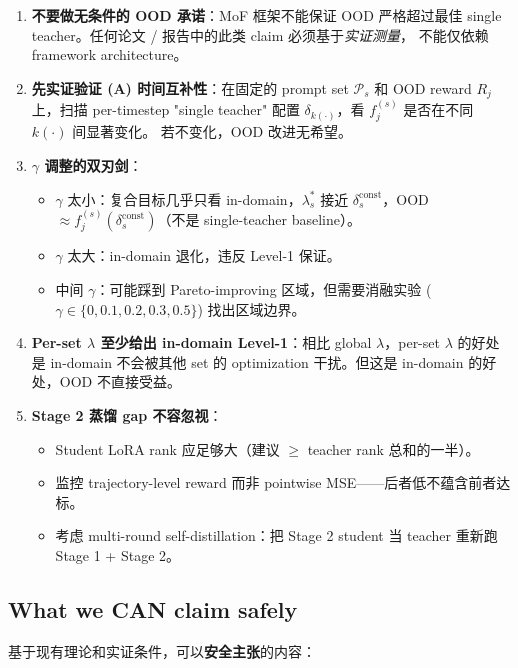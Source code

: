 \documentclass[11pt,a4paper]{article}
\newcommand{\const}{\mathrm{const}}
\theoremstyle{definition}
\begin{document}
\begin{enumerate}[leftmargin=1.5em]
\item \textbf{不要做无条件的 OOD 承诺}：MoF 框架不能保证 OOD 严格超过最佳
single teacher。任何论文 / 报告中的此类 claim 必须基于\emph{实证测量}，
不能仅依赖 framework architecture。

\item \textbf{先实证验证 (A) 时间互补性}：在固定的 prompt set $\mathcal{P}_s$
和 OOD reward $R_j$ 上，扫描 per-timestep "single teacher" 配置
$\delta_{k(\cdot)}$，看 $f_j^{(s)}$ 是否在不同 $k(\cdot)$ 间显著变化。
若不变化，OOD 改进无希望。

\item \textbf{$\gamma$ 调整的双刃剑}：
\begin{itemize}[leftmargin=1em]
\item $\gamma$ 太小：复合目标几乎只看 in-domain，$\lambda_s^*$ 接近
$\delta_s^\const$，OOD $\approx f_j^{(s)}(\delta_s^\const)$（不是
single-teacher baseline）。
\item $\gamma$ 太大：in-domain 退化，违反 Level-1 保证。
\item 中间 $\gamma$：可能踩到 Pareto-improving 区域，但需要消融实验
($\gamma \in \{0, 0.1, 0.2, 0.3, 0.5\}$) 找出区域边界。
\end{itemize}

\item \textbf{Per-set $\lambda$ 至少给出 in-domain Level-1}：相比 global
$\lambda$，per-set $\lambda$ 的好处是 in-domain 不会被其他 set 的
optimization 干扰。但这是 in-domain 的好处，OOD 不直接受益。

\item \textbf{Stage 2 蒸馏 gap 不容忽视}：
\begin{itemize}[leftmargin=1em]
\item Student LoRA rank 应足够大（建议 $\geq$ teacher rank 总和的一半）。
\item 监控 trajectory-level reward 而非 pointwise MSE——后者低不蕴含前者达标。
\item 考虑 multi-round self-distillation：把 Stage 2 student 当 teacher
重新跑 Stage 1 + Stage 2。
\end{itemize}
\end{enumerate}

\subsection{What we CAN claim safely}

基于现有理论和实证条件，可以\textbf{安全主张}的内容：
\end{document}
